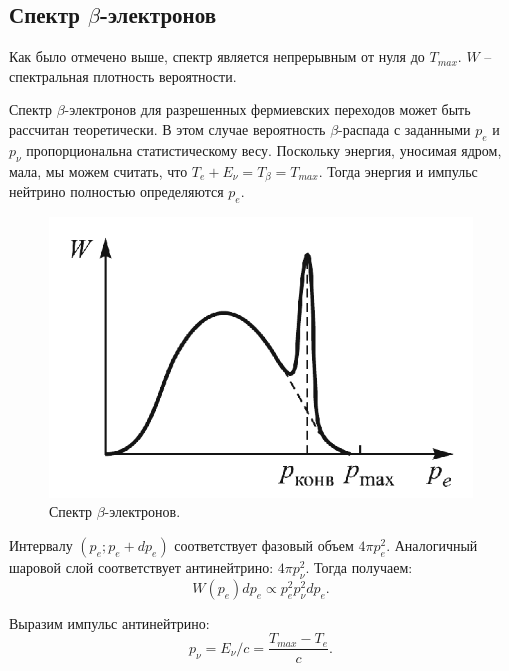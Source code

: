 \documentclass[12pt,a4paper]{article}
\begin{document}
	\subsection*{Спектр $\beta$-электронов}
	
	Как было отмечено выше, спектр является непрерывным от нуля до $T_{max}$. $W$ -- спектральная плотность вероятности.
	
	Спектр $\beta$-электронов для разрешенных фермиевских переходов может быть рассчитан теоретически. В этом случае вероятность $\beta$-распада с заданными $p_e$ и $p_{\nu}$ пропорциональна статистическому весу. Поскольку энергия, уносимая ядром, мала, мы можем считать, что $T_e + E_{\nu} = T_{\beta} = T_{max}$. Тогда энергия и импульс нейтрино полностью определяются $p_e$.
	
	\begin{figure}
		\includegraphics[scale=0.6]{res/spectrum.png}
		\caption{Спектр $\beta$-электронов.}
		\label{fig:spectrum}
		\vspace{0pt}
	\end{figure}
	
	Интервалу $(p_e; p_e + d p_e)$ соответствует фазовый объем $4 \pi p_e^2$. Аналогичный шаровой слой соответствует антинейтрино: $4 \pi p_{\nu}^2$. Тогда получаем:
	\begin{equation}
		W(p_e) dp_e \propto p_e^2 p_{\nu}^2 dp_e.
		\label{eq:probability}
	\end{equation}
	
	Выразим импульс антинейтрино:
	\begin{equation}
		p_{\nu} = E_{\nu} / c = \frac{T_{max} - T_e}{c}.
		\label{eq:impulse_nu}
	\end{equation}
	
\end{document}
